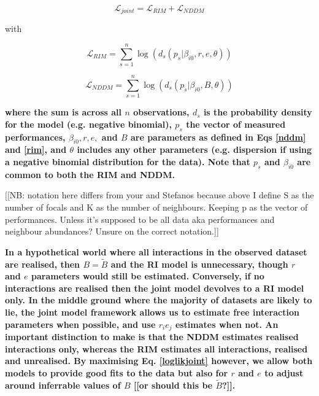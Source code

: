 \documentclass[a4,12pt]{article}
\begin{document}
         \begin{equation}
        \mathcal{L}_{joint} = \mathcal{L}_{RIM} + \mathcal{L}_{NDDM}
        \label{loglikjoint}
        \end{equation}

    with

        \begin{equation}
        \mathcal{L}_{RIM} = \sum_{s=1}^{n} \log (d_s (p_s | \beta_{i0}, r, e, \theta))
        \label{logrim}
        \end{equation}

        \begin{equation}
        \mathcal{L}_{NDDM} = \sum_{s=1}^{n} \log (d_s (p_s | \beta_{i0}, B, \theta))
        \label{lognddm}
        \end{equation}

\textbf{
    where the sum is across all $n$ observations, $d_s$ is the probability density for the model (e.g. negative binomial), $p_s$ the vector of measured performances, $\beta_{i0}, r, e,$ and $B$ are parameters as defined in Eqs \ref{nddm} and \ref{rim}, and $\theta$ includes any other parameters (e.g. dispersion if using a negative binomial distribution for the data). Note that $p_s$ and $\beta_{i0}$ are common to both the RIM and NDDM.}

    [[NB: notation here differs from your and Stefanos because above I define S as the number of focals and K as the number of neighbours. Keeping p as the vector of performances. Unless it's supposed to be all data aka performances and neighbour abundances? Unsure on the correct notation.]]


\textbf{
    In a hypothetical world where all interactions in the observed dataset are realised, then $B = \tilde B$ and the RI model is unnecessary, though $r$ and $e$ parameters would still be estimated. Conversely, if no interactions are realised then the joint model devolves to a RI model only. In the middle ground where the majority of datasets are likely to lie, the joint model framework allows us to estimate free interaction parameters when possible, and use $r_i e_j$ estimates when not.  An important distinction to make is that the NDDM estimates realised interactions only, whereas the RIM estimates all interactions, realised and unrealised.     By maximising Eq. \ref{loglikjoint} however, we allow both models to provide good fits to the data but also for $r$ and $e$ to adjust around inferrable values of $B$ [[or should this be $ \tilde B$?]]. 
}
\end{document}
